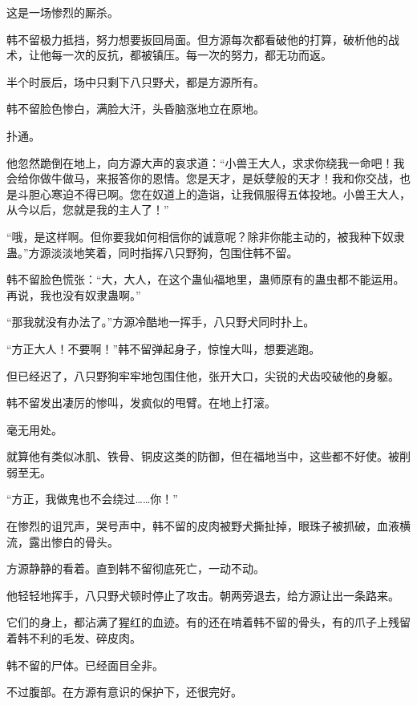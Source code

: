 
\begin{this_body}



这是一场惨烈的厮杀。

韩不留极力抵挡，努力想要扳回局面。但方源每次都看破他的打算，破析他的战术，让他每一次的反抗，都被镇压。每一次的努力，都无功而返。

半个时辰后，场中只剩下八只野犬，都是方源所有。

韩不留脸色惨白，满脸大汗，头昏脑涨地立在原地。

扑通。

他忽然跪倒在地上，向方源大声的哀求道：“小兽王大人，求求你绕我一命吧！我会给你做牛做马，来报答你的恩情。您是天才，是妖孽般的天才！我和你交战，也是斗胆心寒迫不得已啊。您在奴道上的造诣，让我佩服得五体投地。小兽王大人，从今以后，您就是我的主人了！”

“哦，是这样啊。但你要我如何相信你的诚意呢？除非你能主动的，被我种下奴隶蛊。”方源淡淡地笑着，同时指挥八只野狗，包围住韩不留。

韩不留脸色慌张：“大，大人，在这个蛊仙福地里，蛊师原有的蛊虫都不能运用。再说，我也没有奴隶蛊啊。”

“那我就没有办法了。”方源冷酷地一挥手，八只野犬同时扑上。

“方正大人！不要啊！”韩不留弹起身子，惊惶大叫，想要逃跑。

但已经迟了，八只野狗牢牢地包围住他，张开大口，尖锐的犬齿咬破他的身躯。

韩不留发出凄厉的惨叫，发疯似的甩臂。在地上打滚。

毫无用处。

就算他有类似冰肌、铁骨、铜皮这类的防御，但在福地当中，这些都不好使。被削弱至无。

“方正，我做鬼也不会绕过……你！”

在惨烈的诅咒声，哭号声中，韩不留的皮肉被野犬撕扯掉，眼珠子被抓破，血液横流，露出惨白的骨头。

方源静静的看着。直到韩不留彻底死亡，一动不动。

他轻轻地挥手，八只野犬顿时停止了攻击。朝两旁退去，给方源让出一条路来。

它们的身上，都沾满了猩红的血迹。有的还在啃着韩不留的骨头，有的爪子上残留着韩不利的毛发、碎皮肉。

韩不留的尸体。已经面目全非。

不过腹部。在方源有意识的保护下，还很完好。


\end{this_body}
